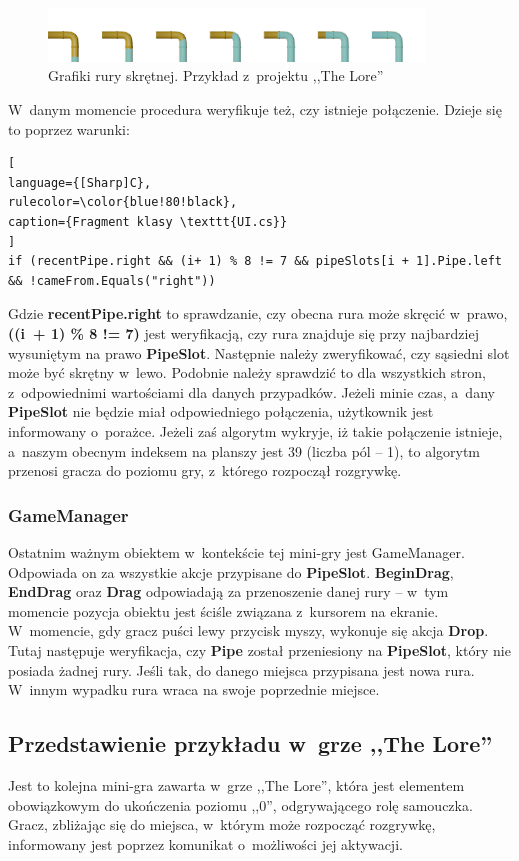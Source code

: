 \documentclass[oneside,polski,logo]{amuthesis}
\begin{document}
\begin{figure}[h]
	\centering
	\includegraphics[width=10cm]{images/tyrek/rury-5.png}
	\caption{Grafiki rury skrętnej. Przykład z~projektu ,,The Lore''}
\end{figure}
W~danym momencie procedura weryfikuje też, czy istnieje połączenie. Dzieje się to poprzez warunki:
\begin{lstlisting}[
language={[Sharp]C},
rulecolor=\color{blue!80!black},
caption={Fragment klasy \texttt{UI.cs}}
]
if (recentPipe.right && (i+ 1) % 8 != 7 && pipeSlots[i + 1].Pipe.left 
&& !cameFrom.Equals("right"))
\end{lstlisting}
Gdzie \textbf{recentPipe.right} to sprawdzanie, czy obecna rura może skręcić w~prawo, \textbf{((i~+ 1) \% 8 != 7)} jest weryfikacją, czy rura znajduje się przy najbardziej wysuniętym na prawo \textbf{PipeSlot}. Następnie należy zweryfikować, czy sąsiedni slot może być skrętny w~lewo. Podobnie należy sprawdzić to dla wszystkich stron, z~odpowiednimi wartościami dla danych przypadków. Jeżeli minie czas, a~dany \textbf{PipeSlot} nie będzie miał odpowiedniego połączenia, użytkownik jest informowany o~porażce. Jeżeli zaś algorytm wykryje, iż takie połączenie istnieje, a~naszym obecnym indeksem na planszy jest 39 (liczba pól – 1), to algorytm przenosi gracza do poziomu gry, z~którego rozpoczął rozgrywkę.

\subsubsection{GameManager}
\par Ostatnim ważnym obiektem w~kontekście tej mini-gry jest GameManager. Odpowiada on za wszystkie akcje przypisane do \textbf{PipeSlot}. \textbf{BeginDrag}, \textbf{EndDrag} oraz \textbf{Drag} odpowiadają za przenoszenie danej rury – w~tym momencie pozycja obiektu jest ściśle związana z~kursorem na ekranie. W~momencie, gdy gracz puści lewy przycisk myszy, wykonuje się akcja \textbf{Drop}. Tutaj następuje weryfikacja, czy \textbf{Pipe} został przeniesiony na \textbf{PipeSlot}, który nie posiada żadnej rury. Jeśli tak, do danego miejsca przypisana jest nowa rura. W~innym wypadku rura wraca na swoje poprzednie miejsce. 
\subsection{Przedstawienie przykładu w~grze ,,The Lore''}
\par Jest to kolejna mini-gra zawarta w~grze ,,The Lore'', która jest elementem obowiązkowym do ukończenia poziomu ,,0'', odgrywającego rolę samouczka. Gracz, zbliżając się do miejsca, w~którym może rozpocząć rozgrywkę, informowany jest poprzez komunikat o~możliwości jej aktywacji.
\end{document}
